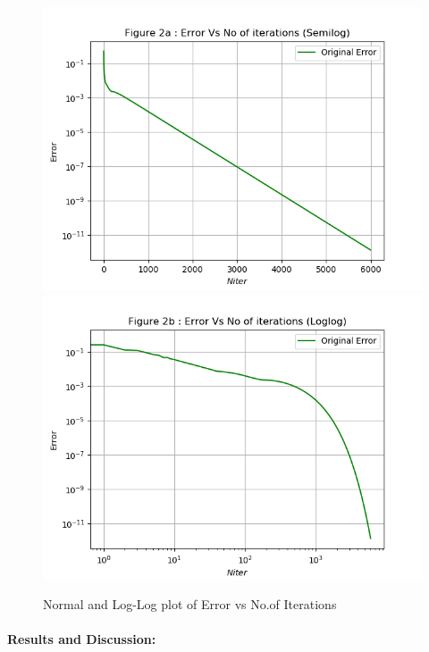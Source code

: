 \documentclass[11pt, a4paper]{article}
\begin{document}
     \begin{figure}[!tbh]
      \centering
      \includegraphics[scale=0.8]{./../Extras/Figure_2.png}  
      \includegraphics[scale=0.8]{./../Extras/Figure_3.png}  
      \caption{Normal and Log-Log plot of Error vs No.of Iterations}
 \end{figure}
 \newpage
 \paragraph{Results and Discussion:}\label{results-and-discussion}
\end{document}
